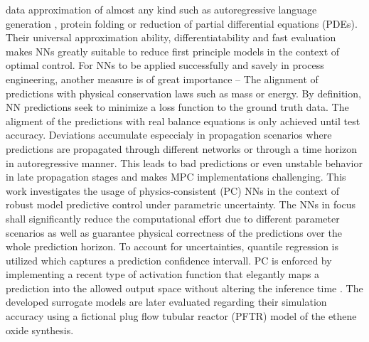 data approximation of almost any kind such as autoregressive language generation \cite{vaswani2023}, protein folding \cite{empty000} or
reduction of partial differential equations (PDEs). Their universal approximation ability, differentiatability and fast evaluation makes NNs greatly suitable to reduce first principle models in
the context of optimal control.
\newline
For NNs to be applied successfully and savely in process engineering, another measure is of great importance – The alignment of 
predictions with physical conservation laws such as mass or energy. By definition, NN predictions seek to minimize a loss function
to the ground truth data. The aligment of the predictions with real balance equations is only achieved until test accuracy. Deviations
accumulate especcialy in propagation scenarios where predictions are propagated through different networks or through a time horizon
in autoregressive manner. This leads to bad predictions or even unstable behavior in late propagation stages and makes MPC
implementations challenging.
\newline
This work investigates the usage of physics-consistent (PC) NNs in the context of robust model predictive control under
parametric uncertainty. The NNs in focus shall significantly reduce the computational effort due to different parameter scenarios as well as 
guarantee physical correctness of the predictions over the whole prediction horizon. To account for uncertainties, quantile
regression is utilized which captures a prediction confidence intervall. PC is enforced by implementing a recent
type of activation function that elegantly maps a prediction into the allowed output space without altering the inference time \cite{chen2024}.
\newline
The developed surrogate models are later evaluated regarding their simulation accuracy using a fictional plug flow tubular reactor (PFTR) model of the ethene oxide synthesis.

